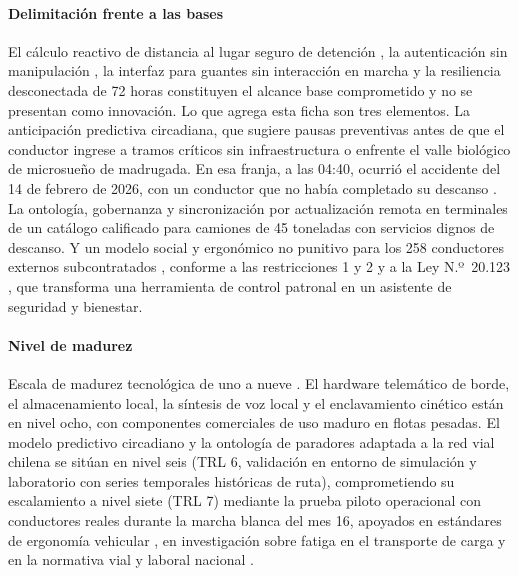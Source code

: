 \paragraph{Delimitación frente a las bases} El cálculo reactivo de distancia al lugar seguro de
detención , la autenticación sin manipulación , la interfaz
para guantes sin interacción en marcha  y la resiliencia desconectada de 72 horas
 constituyen el alcance base comprometido y no se presentan como
innovación. Lo que agrega esta ficha son tres elementos. La anticipación predictiva circadiana, que
sugiere pausas preventivas antes de que el conductor ingrese a tramos críticos sin infraestructura o
enfrente el valle biológico de microsueño de madrugada. En esa franja, a las 04:40, ocurrió el
accidente del 14 de febrero de 2026, con un conductor que no había completado su descanso
. La ontología, gobernanza y sincronización por actualización remota en terminales de un catálogo calificado para
camiones de 45 toneladas con servicios dignos de descanso. Y un modelo social y ergonómico no punitivo
para los 258 conductores externos subcontratados , conforme a las restricciones 1
y 2  y a la Ley N.º~20.123 \parencite{ley20123}, que transforma una herramienta de control patronal en
un asistente de seguridad y bienestar.

\paragraph{Nivel de madurez} Escala de madurez tecnológica de uno a nueve \parencite{iso16290}. El
hardware telemático de borde, el almacenamiento local, la síntesis de voz local y el enclavamiento
cinético están en nivel ocho, con componentes comerciales de uso maduro en flotas pesadas. El modelo
predictivo circadiano y la ontología de paradores adaptada a la red vial chilena se sitúan en nivel
seis (TRL 6, validación en entorno de simulación y laboratorio con series temporales históricas de ruta), comprometiendo
su escalamiento a nivel siete (TRL 7) mediante la prueba piloto operacional con conductores reales durante la marcha blanca del mes 16,
apoyados en estándares de ergonomía vehicular \parencite{iso15005,iso9241_210}, en investigación sobre fatiga en
el transporte de carga \parencite{nasem2016_fatiga} y en la normativa vial y laboral nacional
\parencite{ley21377,codigo_trabajo_25bis}.

